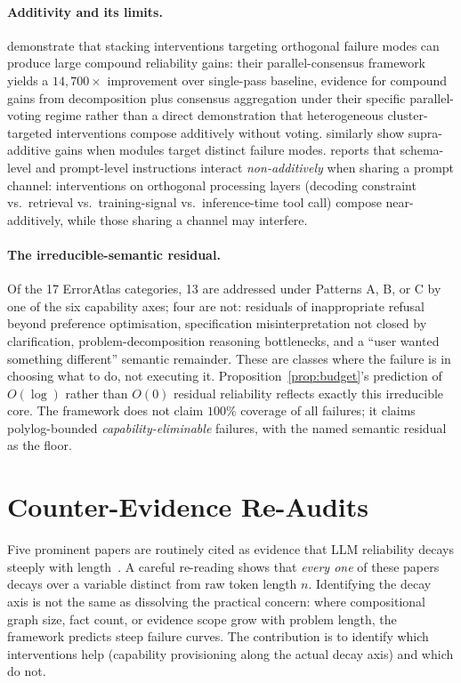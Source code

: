 \documentclass{article}
\theoremstyle{taeplain}
\theoremstyle{taedefn}
\begin{document}
\paragraph{Additivity and its limits.}
\citet{patel2026sixsigma} demonstrate that stacking interventions targeting orthogonal failure modes can produce large compound reliability gains: their parallel-consensus framework yields a $14{,}700\times$ improvement over single-pass baseline, evidence for compound gains from decomposition plus consensus aggregation under their specific parallel-voting regime rather than a direct demonstration that heterogeneous cluster-targeted interventions compose additively without voting. \citet{shang2024agentsquare} similarly show supra-additive gains when modules target distinct failure modes. \citet{le2026interaction} reports that schema-level and prompt-level instructions interact \emph{non-additively} when sharing a prompt channel: interventions on orthogonal processing layers (decoding constraint vs.\ retrieval vs.\ training-signal vs.\ inference-time tool call) compose near-additively, while those sharing a channel may interfere.

\paragraph{The irreducible-semantic residual.}
Of the 17 ErrorAtlas categories, 13 are addressed under Patterns A, B, or C by one of the six capability axes; four are not: residuals of inappropriate refusal beyond preference optimisation, specification misinterpretation not closed by clarification, problem-decomposition reasoning bottlenecks, and a ``user wanted something different'' semantic remainder. These are classes where the failure is in choosing what to do, not executing it. Proposition~\ref{prop:budget}'s prediction of $O(\log)$ rather than $O(0)$ residual reliability reflects exactly this irreducible core. The framework does not claim $100\%$ coverage of all failures; it claims polylog-bounded \emph{capability-eliminable} failures, with the named semantic residual as the floor.

\section{Counter-Evidence Re-Audits}
\label{app:reaudits}

Five prominent papers are routinely cited as evidence that LLM reliability decays steeply with length~\citep{dziri2023faith,kuratov2024babilong,kwa2025horizon,wan2026fano,karpinska2024nocha}. A careful re-reading shows that \emph{every one} of these papers decays over a variable distinct from raw token length $n$. Identifying the decay axis is not the same as dissolving the practical concern: where compositional graph size, fact count, or evidence scope grow with problem length, the framework predicts steep failure curves. The contribution is to identify which interventions help (capability provisioning along the actual decay axis) and which do not.
\end{document}
